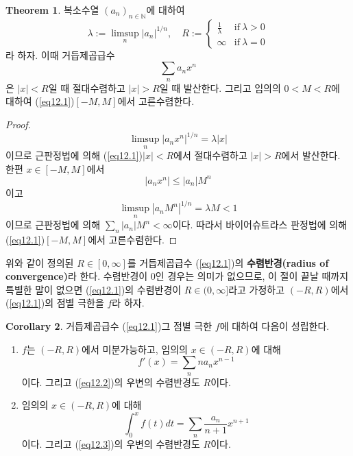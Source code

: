 \documentclass[11pt]{book}
\numberwithin{equation}{chapter}
\def\NN{\mathbb{N}}
\newcommand{\abs}[1]{\left\vert#1\right\vert}
\def\textif{\text{if}}
\theoremstyle{definition}
\newtheorem{thm}{Theorem}[section]
\newtheorem{cor}[thm]{Corollary}
\newenvironment{enum}
	{\begin{enumerate}[label=(\alph*), leftmargin=2\parindent]}
	{\end{enumerate}}
\begin{document}
\begin{thm} \label{12.3.2}
    복소수열 \((a_n)_{n \in \NN}\)에 대하여
    \[
    \lambda := \limsup_n \abs{a_n}^{1/n}, \quad R := \begin{cases}
        \frac{1}{\lambda} &\textif \ \lambda > 0\\
        \infty &\textif \ \lambda = 0
    \end{cases}
    \]
    라 하자. 이때 거듭제곱급수
    \begin{equation} \label{eq12.1}
        \sum_n a_n x^n
    \end{equation}
    은 \(\abs{x} < R\)일 때 절대수렴하고 \(\abs{x} > R\)일 때 발산한다. 그리고 임의의 \(0 < M < R\)에 대하여 (\ref{eq12.1})\은 \([-M, M]\)에서 고른수렴한다.
\end{thm}
\begin{proof}
    \[
    \limsup_n \abs{a_n x^n}^{1/n} = \lambda\abs{x}    
    \]
    이므로 근판정법에 의해 (\ref{eq12.1})\은 \(\abs{x} < R\)에서 절대수렴하고 \(\abs{x} > R\)에서 발산한다. 한편 \(x \in [-M, M]\)에서
    \[
    \abs{a_n x^n} \le \abs{a_n} M^n  
    \]
    이고
    \[
    \limsup_n \abs{a_n M^n}^{1/n} = \lambda M < 1    
    \]
    이므로 근판정법에 의해 \(\sum_n \abs{a_n}M^n < \infty\)이다. 따라서 바이어슈트라스 판정법에 의해 (\ref{eq12.1})\은 \([-M, M]\)에서 고른수렴한다.
\end{proof}

위와 같이 정의된 \(R \in [0, \infty]\)를 거듭제곱급수 (\ref{eq12.1})의 \textbf{수렴반경(radius of convergence)}라 한다. 수렴반경이 0인 경우는 의미가 없으므로, 이 절이 끝날 때까지 특별한 말이 없으면 (\ref{eq12.1})의 수렴반경이 \(R \in (0, \infty]\)라고 가정하고 \((-R, R)\)에서 (\ref{eq12.1})의 점별 극한을 \(f\)라 하자.

\begin{cor} \label{12.3.3}
    거듭제곱급수 (\ref{eq12.1})\과 그 점별 극한 \(f\)에 대하여 다음이 성립한다.
    \begin{enum}
        \item \(f\)는 \((-R, R)\)에서 미분가능하고, 임의의 \(x \in (-R, R)\)에 대해
        \begin{equation} \label{eq12.2}
            f'(x) = \sum_n na_n x^{n-1}
        \end{equation}
        이다. 그리고 (\ref{eq12.2})의 우변의 수렴반경도 \(R\)이다.
        \item 임의의 \(x \in (-R, R)\)에 대해
        \begin{equation} \label{eq12.3}
            \int_0^x f(t)dt = \sum_n \frac{a_n}{n+1}x^{n+1}
        \end{equation}
        이다. 그리고 (\ref{eq12.3})의 우변의 수렴반경도 \(R\)이다. 
    \end{enum}
\end{cor}
\end{document}
